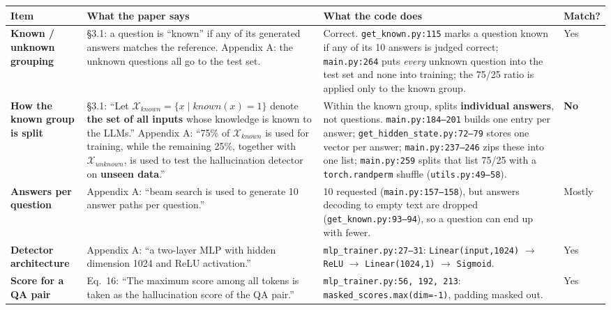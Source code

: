 \documentclass[11pt,a4paper]{article}
\begin{document}
\renewcommand{\arraystretch}{1.3}
\begin{table}[h]
\centering\footnotesize
\begin{tabular}{L{2.2cm} L{4.7cm} L{5.4cm} L{1.6cm}}
\toprule
\textbf{Item} & \textbf{What the paper says} & \textbf{What the code does} & \textbf{Match?} \\
\midrule

\textbf{Known / unknown grouping}
& \S3.1: a question is ``known'' if any of its generated answers matches the reference. Appendix A:
the unknown questions all go to the test set.
& Correct. \texttt{get\_known.py:115} marks a question known if any of its 10 answers is judged
correct; \texttt{main.py:264} puts \emph{every} unknown question into the test set and none into
training; the 75/25 ratio is applied only to the known group.
& Yes \\

\textbf{How the known group is split}
& \S3.1: ``Let $\mathcal{X}_{known} = \{x \mid known(x)=1\}$ denote \textbf{the set of all inputs}
whose knowledge is known to the LLMs.'' \newline
Appendix A: ``75\% of $\mathcal{X}_{known}$ is used for training, while the remaining 25\%,
together with $\mathcal{X}_{unknown}$, is used to test the hallucination detector on
\textbf{unseen data}.''
& Within the known group, splits \textbf{individual answers}, not questions.
\texttt{main.py:184--201} builds one entry per answer;
\texttt{get\_hidden\_state.py:72--79} stores one vector per answer;
\texttt{main.py:237--246} zips these into one list;
\texttt{main.py:259} splits that list 75/25 with a \texttt{torch.randperm} shuffle
(\texttt{utils.py:49--58}).
& \textbf{No} \\

\textbf{Answers per question}
& Appendix A: ``beam search is used to generate 10 answer paths per question.''
& 10 requested (\texttt{main.py:157--158}), but answers decoding to empty text are dropped
(\texttt{get\_known.py:93--94}), so a question can end up with fewer.
& Mostly \\

\textbf{Detector architecture}
& Appendix A: ``a two-layer MLP with hidden dimension 1024 and ReLU activation.''
& \texttt{mlp\_trainer.py:27--31}: \texttt{Linear(input,1024)} $\to$ \texttt{ReLU} $\to$
\texttt{Linear(1024,1)} $\to$ \texttt{Sigmoid}.
& Yes \\

\textbf{Score for a QA pair}
& Eq.~16: ``The maximum score among all tokens is taken as the hallucination score of the QA pair.''
& \texttt{mlp\_trainer.py:56, 192, 213}: \texttt{masked\_scores.max(dim=-1)}, padding masked out.
& Yes \\


\end{tabular}
\end{table}
\end{document}
